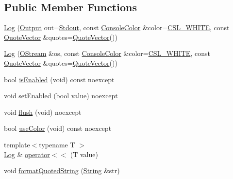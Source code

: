 \subsection*{Public Member Functions}
\begin{DoxyCompactItemize}
\item 
\mbox{\hyperlink{classo_a_1_1_log_a8f57798a38bc53782107ee07f2f2caa5}{Log}} (\mbox{\hyperlink{classo_a_1_1_log_a640171dc239ea7befcd640362343f88f}{Output}} out=\mbox{\hyperlink{classo_a_1_1_log_a640171dc239ea7befcd640362343f88fa6504dea4a3bf34c8734b664b6364a0d9}{Stdout}}, const \mbox{\hyperlink{namespaceo_a_a747e07c1977a29f3e1d38683043ec927}{Console\+Color}} \&color=\mbox{\hyperlink{namespaceo_a_a4afb55957ed6dcda70e81d6dd8f07885}{C\+S\+L\+\_\+\+W\+H\+I\+TE}}, const \mbox{\hyperlink{namespaceo_a_a38695044d9ec0b57190f4e3fab0caffd}{Quote\+Vector}} \&quotes=\mbox{\hyperlink{namespaceo_a_a38695044d9ec0b57190f4e3fab0caffd}{Quote\+Vector}}())
\item 
\mbox{\hyperlink{classo_a_1_1_log_a69d8bda8bb1a902606866c757df8c018}{Log}} (\mbox{\hyperlink{namespaceo_a_ab69b2110953f22401259db9c6ddc7905}{O\+Stream}} \&os, const \mbox{\hyperlink{namespaceo_a_a747e07c1977a29f3e1d38683043ec927}{Console\+Color}} \&color=\mbox{\hyperlink{namespaceo_a_a4afb55957ed6dcda70e81d6dd8f07885}{C\+S\+L\+\_\+\+W\+H\+I\+TE}}, const \mbox{\hyperlink{namespaceo_a_a38695044d9ec0b57190f4e3fab0caffd}{Quote\+Vector}} \&quotes=\mbox{\hyperlink{namespaceo_a_a38695044d9ec0b57190f4e3fab0caffd}{Quote\+Vector}}())
\item 
bool \mbox{\hyperlink{classo_a_1_1_log_ada21589725c48f82d05893e5936522ea}{is\+Enabled}} (void) const noexcept
\item 
void \mbox{\hyperlink{classo_a_1_1_log_a7c4699ea7ad0c8b910b4a3fc57ba5afe}{set\+Enabled}} (bool value) noexcept
\item 
void \mbox{\hyperlink{classo_a_1_1_log_ae0c062e6cd347b0e74f74c958a05b20d}{flush}} (void) noexcept
\item 
bool \mbox{\hyperlink{classo_a_1_1_log_a212bf1558c244679cf0e361fc1cf1e9a}{use\+Color}} (void) const noexcept
\item 
{\footnotesize template$<$typename T $>$ }\\\mbox{\hyperlink{classo_a_1_1_log}{Log}} \& \mbox{\hyperlink{classo_a_1_1_log_a6ce6d2f750bf3baeda1c2541617e4952}{operator$<$$<$}} (T value)
\item 
void \mbox{\hyperlink{classo_a_1_1_log_a8b2af8c62c63699ba4caebafb37e9268}{format\+Quoted\+String}} (\mbox{\hyperlink{classo_a_1_1_string}{String}} \&str)

\end{DoxyCompactItemize}
